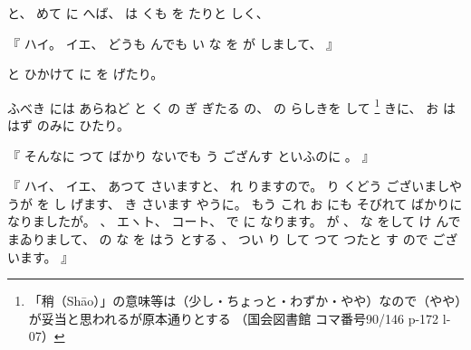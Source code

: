 %
と、
%
めて
に
へば、
%
は
くも
を
たりと
しく、

%
『
ハイ。
%
イエ、
%
どうも
んでも
い
な
を
が
しまして、
』

%
と
ひかけて
に
を
げたり。

%
ふべき
には
あらねど
と
く
の
ぎ
ぎたる
の、
%
の
らしきを
して
\footnote{「稍（Shāo）」の意味等は（少し・ちょっと・わずか・やや）なので（やや）が妥当と思われるが原本通りとする
（国会図書館 コマ番号90/146 p-172 l-07）}%
きに、
%
お
は
はず
のみに
ひたり。

%
『
そんなに
つて
ばかり
ないでも
う
ござんす
といふのに
。
』

%
『
ハイ、
%
イエ、
%
あつて
さいますと、
%
れ%
りますので。
%
り
くどう
ございましやうが
を
し
げます、
%
き
さいます
やうに。
%
%
もう
これ
お
にも
そびれて
ばかりに
なりましたが。
%
、
エヽト、
%
コート、
%
で
に
なります。
%
が
、
%
な
をして
け
んで
まゐりまして、
%
の
な
を
はう
とする
、
%
つい
り
して
つて
つたと
す
ので
ございます。
』

